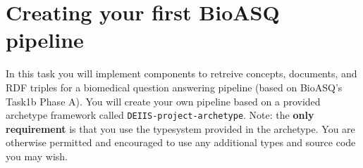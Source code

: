 
%
\chapter{Creating your first BioASQ pipeline}
\vspace{-1cm}
In this task you will implement components to retreive concepts, documents, and RDF triples for a biomedical question answering pipeline (based on BioASQ's Task1b Phase A). You will create your own pipeline based on a provided archetype framework called \texttt{DEIIS-project-archetype}. Note: the \textbf{only requirement} is that you use the typesystem provided in the archetype. You are otherwise permitted and encouraged to use any additional types and source code you may wish.



